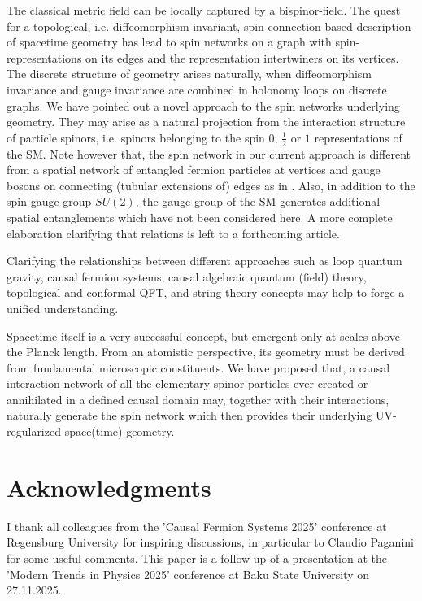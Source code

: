 \documentclass[11pt,a4paper]{article}
\theoremstyle{definition}
\begin{document}
	The classical metric field can be locally captured by a bispinor-field.
	The quest for a topological, i.e. diffeomorphism invariant, spin-connection-based description of spacetime geometry has lead to spin networks on a graph with spin-representations on its edges and the representation intertwiners on its vertices. The discrete structure of geometry arises naturally, when diffeomorphism invariance and gauge invariance are combined in holonomy loops on discrete graphs. We have pointed out a novel approach to the spin networks underlying geometry. They may arise as a natural projection from the interaction structure of particle spinors, i.e. spinors belonging to the spin $0$, $\frac{1}{2}$ or $1$ representations of the SM. Note however that, the spin network in our current approach is different from a spatial network of entangled fermion particles at vertices and gauge bosons on connecting (tubular extensions of) edges as in \cite{rainer1994particlenet}. Also, in addition to the spin gauge group $SU(2)$, the gauge group of the SM generates additional spatial entanglements which have not been considered here. A more complete elaboration clarifying that relations is left to a forthcoming article.   
	
	Clarifying the relationships between different approaches such as loop quantum gravity, causal fermion systems, causal algebraic quantum (field) theory, topological and conformal QFT, and string theory concepts may help to forge a unified understanding.
	
	Spacetime itself is a very successful concept, but emergent only at scales above the Planck length. From an atomistic perspective, its geometry must be derived from fundamental microscopic constituents. 
	We have proposed that, a causal interaction network of all the elementary spinor particles ever created or annihilated in a defined causal domain may, together with their interactions, naturally generate the spin network which then provides their underlying UV-regularized space(time) geometry.
	
	\section*{Acknowledgments}
	
	I thank all colleagues from the 'Causal Fermion Systems 2025' conference at Regensburg University for inspiring discussions, in particular to Claudio Paganini for some useful comments. This paper is a follow up of a presentation at the 'Modern Trends in Physics 2025' conference at Baku State University on 27.11.2025.
	
\end{document}
